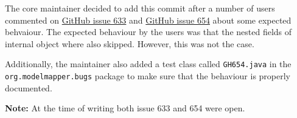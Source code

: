 \documentclass[12pt]{article}
\newcommand{\note}[1]{\textbf{Note:} #1}
\begin{document}
The core maintainer decided to add this commit after a number of
users commented on
\href{https://github.com/modelmapper/modelmapper/issues/633}{GitHub
issue 633} and
\href{https://github.com/modelmapper/modelmapper/issues/654}{GitHub
issue 654} about some expected behvaiour. The expected behaviour
by the users was that the nested fields of internal object where
also skipped. However, this was not the case.

Additionally, the maintainer also added a test class called
\texttt{GH654.java} in the \linebreak \texttt{org.modelmapper.bugs} package
to make sure that the behaviour is properly documented.

\note{At the time of writing both issue 633 and 654 were open.}
\end{document}
